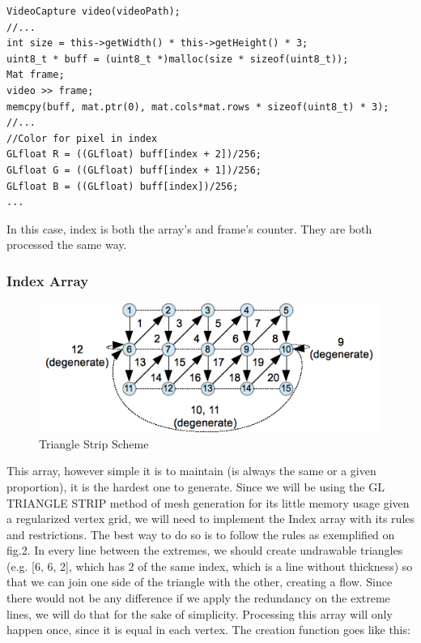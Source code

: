\documentclass[11pt]{article}
\begin{document}
\begin{verbatim}
VideoCapture video(videoPath);
//...
int size = this->getWidth() * this->getHeight() * 3;
uint8_t * buff = (uint8_t *)malloc(size * sizeof(uint8_t));
Mat frame;
video >> frame;
memcpy(buff, mat.ptr(0), mat.cols*mat.rows * sizeof(uint8_t) * 3);
//...
//Color for pixel in index
GLfloat R = ((GLfloat) buff[index + 2])/256;
GLfloat G = ((GLfloat) buff[index + 1])/256;
GLfloat B = ((GLfloat) buff[index])/256;
...
\end{verbatim}

In this case, index is both the array’s and frame’s counter. They are both processed the same way.

\subsubsection*{Index Array}
\label{sec:org16921ec}

\begin{figure}[htbp]
\centering
\includegraphics[width=.9\linewidth]{res/strip.png}
\caption{Triangle Strip Scheme}
\end{figure}

This array, however simple it is to maintain (is always the same or a given proportion), it is the hardest one to generate. Since we will be using the GL TRIANGLE STRIP method of mesh generation for its little memory usage given a regularized vertex grid, we will need to implement the Index array with its rules and restrictions. The best way to do so is to follow the rules as exemplified on fig.2. In every line between the extremes, we should create undrawable triangles (e.g. [6, 6, 2], which has 2 of the same index, which is a line without thickness) so that we can join one side of the triangle with the other, creating a flow. Since there would not be any difference if we apply the redundancy on the extreme lines, we will do that for the sake of simplicity. Processing this array will only happen once, since it is equal in each vertex. The creation function goes like this:
\end{document}
